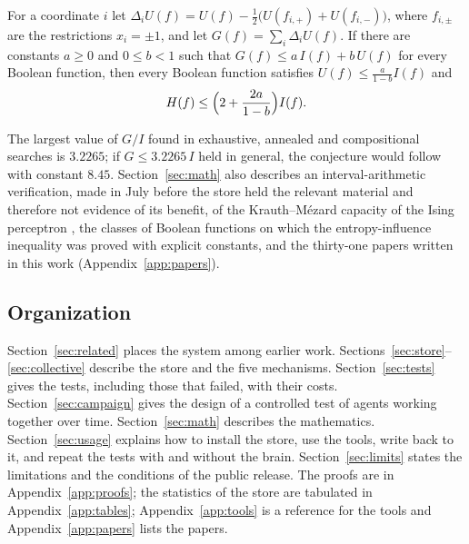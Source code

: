 \begin{theorem}\label{thm:intro-GU}
For a coordinate $i$ let $\Delta_iU(f)=U(f)-\tfrac12\bigl(U(f_{i,+})+U(f_{i,-})\bigr)$, where $f_{i,\pm}$ are the restrictions $x_i=\pm1$, and let $G(f)=\sum_i\Delta_iU(f)$. If there are constants $a\ge0$ and $0\le b<1$ such that $G(f)\le a\,I(f)+b\,U(f)$ for every Boolean function, then every Boolean function satisfies $U(f)\le\frac{a}{1-b}I(f)$ and
\[
H(f)\le\Bigl(2+\frac{2a}{1-b}\Bigr)I(f).
\]
\end{theorem}

The largest value of $G/I$ found in exhaustive, annealed and compositional searches is $3.2265$; if $G\le 3.2265\,I$ held in general, the conjecture would follow with constant $8.45$. Section~\ref{sec:math} also describes an interval-arithmetic verification, made in July before the store held the relevant material and therefore not evidence of its benefit, of the Krauth--M\'ezard capacity of the Ising perceptron \cite{KrauthMezard1989,DingSun2019,Huang2024}, the classes of Boolean functions on which the entropy-influence inequality was proved with explicit constants, and the thirty-one papers written in this work (Appendix~\ref{app:papers}).

\subsection{Organization}

Section~\ref{sec:related} places the system among earlier work. Sections~\ref{sec:store}--\ref{sec:collective} describe the store and the five mechanisms. Section~\ref{sec:tests} gives the tests, including those that failed, with their costs. Section~\ref{sec:campaign} gives the design of a controlled test of agents working together over time. Section~\ref{sec:math} describes the mathematics. Section~\ref{sec:usage} explains how to install the store, use the tools, write back to it, and repeat the tests with and without the brain. Section~\ref{sec:limits} states the limitations and the conditions of the public release. The proofs are in Appendix~\ref{app:proofs}; the statistics of the store are tabulated in Appendix~\ref{app:tables}; Appendix~\ref{app:tools} is a reference for the tools and Appendix~\ref{app:papers} lists the papers.
